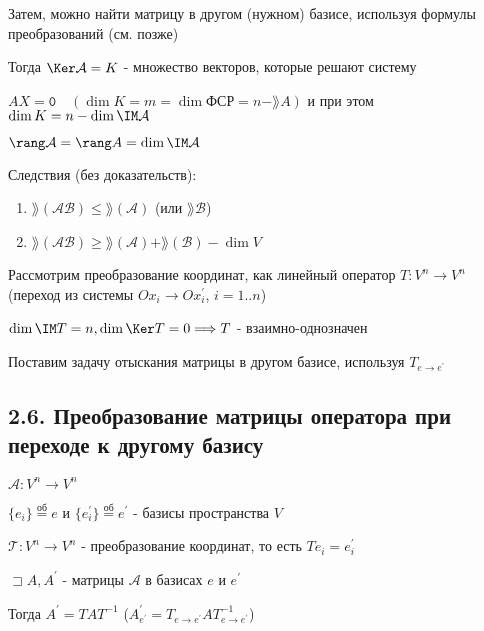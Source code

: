 \documentclass[12pt]{article}
\begin{document}
    Затем, можно найти матрицу в другом (нужном) базисе, используя формулы преобразований (см. \Ths позже)

    Тогда $\Ker \mathcal{A} = K$ - множество векторов, которые решают систему

    $AX = \texttt{0} \quad (\dim K = m = \dim \text{ФСР} = n - \rang A)$ и при этом $\dim K = n - \dim \IM \mathcal{A}$

    $\rang \mathcal{A} = \rang A = \dim \IM \mathcal{A}$

    Следствия (без доказательств):

    \begin{enumerate}
        \item $\rang(\mathcal{AB}) \leq \rang(\mathcal{A})$ (или $\rang \mathcal{B}$)

        \item $\rang(\mathcal{AB}) \geq \rang(\mathcal{A}) + \rang(\mathcal{B}) - \dim V$
    \end{enumerate}

    \Nota Рассмотрим преобразование координат, как линейный оператор $T : V^n \rightarrow V^n$ (переход из системы $Ox_i \rightarrow Ox_i^\prime$, $i = 1..n$)

    $\dim \IM T = n, \dim \Ker T = 0 \Longrightarrow T$ - взаимно-однозначен

    Поставим задачу отыскания матрицы в другом базисе, используя $T_{e \to e^\prime}$

    \subsection{2.6. Преобразование матрицы оператора при переходе к другому базису}

    \hypertarget{transformationtodifferentbasis}{}

    \begin{MyTheorem}
        \Ths $\mathcal{A} : V^n \rightarrow V^n$

        $\{e_i\} \stackrel{\text{об}}{=} e$ и $\{e^\prime_i\} \stackrel{\text{об}}{=} e^\prime$ - базисы пространства $V$

        $\mathcal{T} : V^n \rightarrow V^n$ - преобразование координат, то есть $Te_i = e^\prime_i$

        $\sqsupset A, A^\prime$ - матрицы $\mathcal{A}$ в базисах $e$ и $e^\prime$

        Тогда $A^\prime = TAT^{-1}$ ($A^\prime_{e^\prime} = T_{e\to e^\prime}AT^{-1}_{e\to e^\prime}$)
    \end{MyTheorem}
\end{document}
